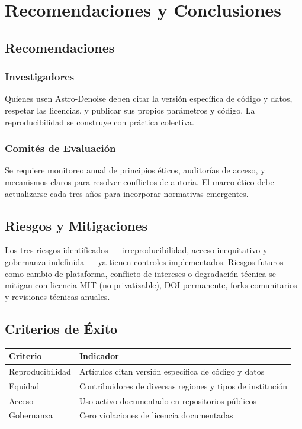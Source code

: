 \section{Recomendaciones y Conclusiones}

\subsection{Recomendaciones}

\subsubsection{Investigadores}

Quienes usen Astro-Denoise deben citar la versión específica de código y datos, respetar las licencias, y publicar sus propios parámetros y código. La reproducibilidad se construye con práctica colectiva.

\subsubsection{Comités de Evaluación}

Se requiere monitoreo anual de principios éticos, auditorías de acceso, y mecanismos claros para resolver conflictos de autoría. El marco ético debe actualizarse cada tres años para incorporar normativas emergentes.

\subsection{Riesgos y Mitigaciones}

Los tres riesgos identificados — irreproducibilidad, acceso inequitativo y gobernanza indefinida — ya tienen controles implementados. Riesgos futuros como cambio de plataforma, conflicto de intereses o degradación técnica se mitigan con licencia MIT (no privatizable), DOI permanente, forks comunitarios y revisiones técnicas anuales.

\subsection{Criterios de Éxito}

\begin{table}[H]
\centering
\small
\begin{tabular}{|p{3cm}|p{5cm}|}
\hline
\textbf{Criterio} & \textbf{Indicador} \\
\hline
Reproducibilidad & Artículos citan versión específica de código y datos \\
\hline
Equidad & Contribuidores de diversas regiones y tipos de institución \\
\hline
Acceso & Uso activo documentado en repositorios públicos \\
\hline
Gobernanza & Cero violaciones de licencia documentadas \\
\hline
\end{tabular}
\end{table}

